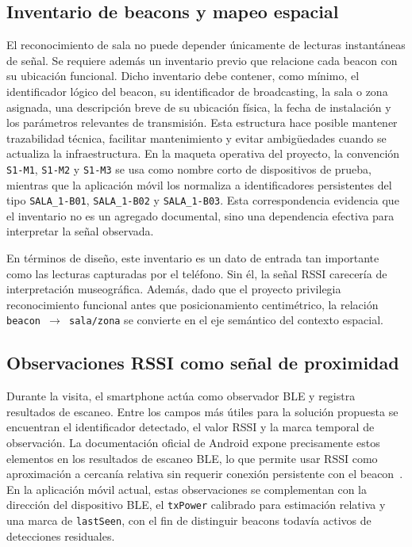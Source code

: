 \subsection{Inventario de beacons y mapeo espacial}

El reconocimiento de sala no puede depender únicamente de lecturas instantáneas de señal. Se requiere además un inventario previo que relacione cada beacon con su ubicación funcional. Dicho inventario debe contener, como mínimo, el identificador lógico del beacon, su identificador de broadcasting, la sala o zona asignada, una descripción breve de su ubicación física, la fecha de instalación y los parámetros relevantes de transmisión. Esta estructura hace posible mantener trazabilidad técnica, facilitar mantenimiento y evitar ambigüedades cuando se actualiza la infraestructura. En la maqueta operativa del proyecto, la convención \texttt{S1-M1}, \texttt{S1-M2} y \texttt{S1-M3} se usa como nombre corto de dispositivos de prueba, mientras que la aplicación móvil los normaliza a identificadores persistentes del tipo \texttt{SALA\_1-B01}, \texttt{SALA\_1-B02} y \texttt{SALA\_1-B03}. Esta correspondencia evidencia que el inventario no es un agregado documental, sino una dependencia efectiva para interpretar la señal observada.

En términos de diseño, este inventario es un dato de entrada tan importante como las lecturas capturadas por el teléfono. Sin él, la señal RSSI carecería de interpretación museográfica. Además, dado que el proyecto privilegia reconocimiento funcional antes que posicionamiento centimétrico, la relación \texttt{beacon $\rightarrow$ sala/zona} se convierte en el eje semántico del contexto espacial.

\subsection{Observaciones RSSI como señal de proximidad}

Durante la visita, el smartphone actúa como observador BLE y registra resultados de escaneo. Entre los campos más útiles para la solución propuesta se encuentran el identificador detectado, el valor RSSI y la marca temporal de observación. La documentación oficial de Android expone precisamente estos elementos en los resultados de escaneo BLE, lo que permite usar RSSI como aproximación a cercanía relativa sin requerir conexión persistente con el beacon~\cite{android2026scanresult}. En la aplicación móvil actual, estas observaciones se complementan con la dirección del dispositivo BLE, el \texttt{txPower} calibrado para estimación relativa y una marca de \texttt{lastSeen}, con el fin de distinguir beacons todavía activos de detecciones residuales.

